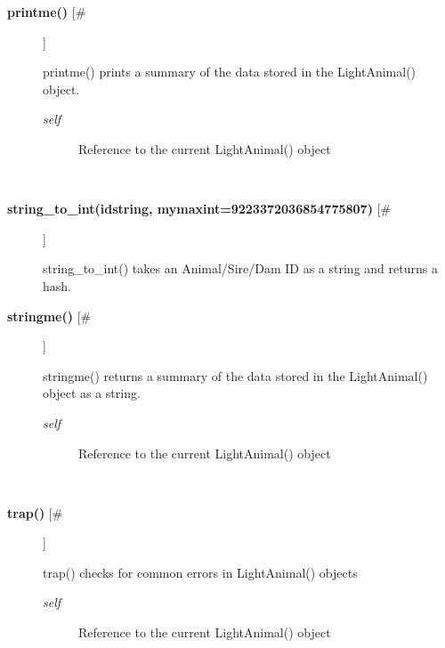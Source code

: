 \begin{description}
\item[\textbf{printme()} [\#]
]
\par printme() prints a summary of the data stored in the LightAnimal() object.
\begin{description}
\item[\textit{self}
]
Reference to the current LightAnimal() object
\end{description}\\

\item[\textbf{string\_to\_int(idstring, mymaxint=9223372036854775807)} [\#]
]
\par string\_to\_int() takes an Animal/Sire/Dam ID as a string and returns a
hash.

\item[\textbf{stringme()} [\#]
]
\par stringme() returns a summary of the data stored in the LightAnimal() object
as a string.
\begin{description}
\item[\textit{self}
]
Reference to the current LightAnimal() object
\end{description}\\

\item[\textbf{trap()} [\#]
]
\par trap() checks for common errors in LightAnimal() objects
\begin{description}
\item[\textit{self}
]
Reference to the current LightAnimal() object
\end{description}\\

\end{description}
